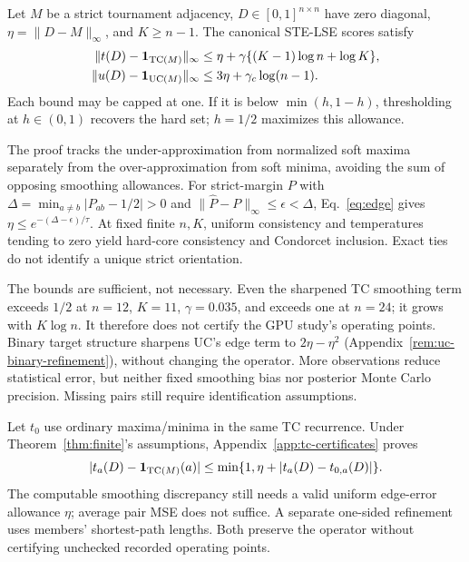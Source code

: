 \begin{theorem}\label{thm:finite}
Let $M$ be a strict tournament adjacency, $D\in[0,1]^{n\times n}$ have zero diagonal, $\eta=\|D-M\|_\infty$, and $K\ge n-1$. The canonical STE-LSE scores satisfy
\begin{align}
\|t(D)-\mathbf1_{\mathrm{TC}(M)}\|_\infty
&\le\eta+\gamma\{(K-1)\log n+\log K\},\label{eq:tc-bound}\\
\|u(D)-\mathbf1_{\mathrm{UC}(M)}\|_\infty
&\le3\eta+\gamma_c\log(n-1).\label{eq:uc-bound}
\end{align}
Each bound may be capped at one. If it is below $\min(h,1-h)$, thresholding at $h\in(0,1)$ recovers the hard set; $h=1/2$ maximizes this allowance.
\end{theorem}
The proof tracks the under-approximation from normalized soft maxima separately from the over-approximation from soft minima, avoiding the sum of opposing smoothing allowances. For strict-margin $P$ with $\Delta=\min_{a\ne b}|P_{ab}-1/2|>0$ and $\|\widehat P-P\|_\infty\le\epsilon<\Delta$, Eq.~\eqref{eq:edge} gives $\eta\le e^{-(\Delta-\epsilon)/\tau}$. At fixed finite $n,K$, uniform consistency and temperatures tending to zero yield hard-core consistency and Condorcet inclusion. Exact ties do not identify a unique strict orientation.

The bounds are sufficient, not necessary. Even the sharpened TC smoothing term exceeds $1/2$ at $n=12$, $K=11$, $\gamma=0.035$, and exceeds one at $n=24$; it grows with $K\log n$. It therefore does not certify the GPU study's operating points. Binary target structure sharpens UC's edge term to $2\eta-\eta^2$ (Appendix~\ref{rem:uc-binary-refinement}), without changing the operator. More observations reduce statistical error, but neither fixed smoothing bias nor posterior Monte Carlo precision. Missing pairs still require identification assumptions.

Let $t_0$ use ordinary maxima/minima in the same TC recurrence. Under Theorem~\ref{thm:finite}'s assumptions, Appendix~\ref{app:tc-certificates} proves
\[
|t_a(D)-\mathbf1_{\mathrm{TC}(M)}(a)|
\le\min\{1,\eta+|t_a(D)-t_{0,a}(D)|\}.
\]
The computable smoothing discrepancy still needs a valid uniform edge-error allowance $\eta$; average pair MSE does not suffice. A separate one-sided refinement uses members' shortest-path lengths. Both preserve the operator without certifying unchecked recorded operating points.

